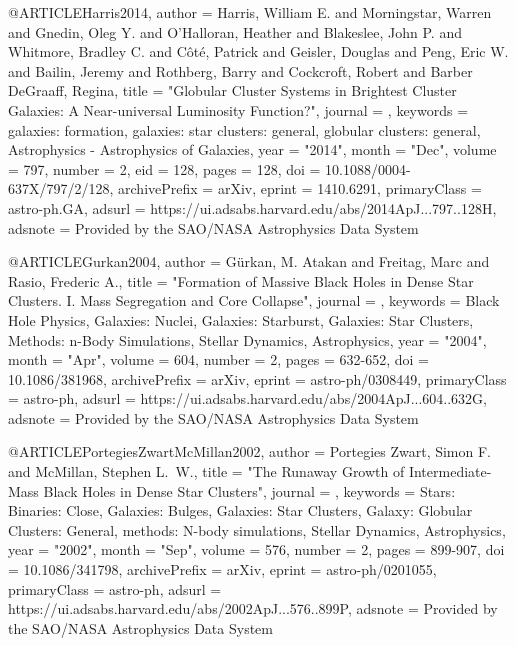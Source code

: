 \documentclass[twocolumn,tighten]{aastex63}
\begin{document}
{@ARTICLE{Harris2014,
       author = {{Harris}, William E. and {Morningstar}, Warren and {Gnedin}, Oleg Y. and
         {O'Halloran}, Heather and {Blakeslee}, John P. and
         {Whitmore}, Bradley C. and {C{\^o}t{\'e}}, Patrick and
         {Geisler}, Douglas and {Peng}, Eric W. and {Bailin}, Jeremy and
         {Rothberg}, Barry and {Cockcroft}, Robert and {Barber DeGraaff}, Regina},
        title = "{Globular Cluster Systems in Brightest Cluster Galaxies: A Near-universal Luminosity Function?}",
      journal = {\apj},
     keywords = {galaxies: formation, galaxies: star clusters: general, globular clusters: general, Astrophysics - Astrophysics of Galaxies},
         year = "2014",
        month = "Dec",
       volume = {797},
       number = {2},
          eid = {128},
        pages = {128},
          doi = {10.1088/0004-637X/797/2/128},
archivePrefix = {arXiv},
       eprint = {1410.6291},
 primaryClass = {astro-ph.GA},
       adsurl = {https://ui.adsabs.harvard.edu/abs/2014ApJ...797..128H},
      adsnote = {Provided by the SAO/NASA Astrophysics Data System}
}

@ARTICLE{Gurkan2004,
       author = {{G{\"u}rkan}, M. Atakan and {Freitag}, Marc and {Rasio}, Frederic A.},
        title = "{Formation of Massive Black Holes in Dense Star Clusters. I. Mass Segregation and Core Collapse}",
      journal = {\apj},
     keywords = {Black Hole Physics, Galaxies: Nuclei, Galaxies: Starburst, Galaxies: Star Clusters, Methods: n-Body Simulations, Stellar Dynamics, Astrophysics},
         year = "2004",
        month = "Apr",
       volume = {604},
       number = {2},
        pages = {632-652},
          doi = {10.1086/381968},
archivePrefix = {arXiv},
       eprint = {astro-ph/0308449},
 primaryClass = {astro-ph},
       adsurl = {https://ui.adsabs.harvard.edu/abs/2004ApJ...604..632G},
      adsnote = {Provided by the SAO/NASA Astrophysics Data System}
}

@ARTICLE{PortegiesZwartMcMillan2002,
       author = {{Portegies Zwart}, Simon F. and {McMillan}, Stephen L.~W.},
        title = "{The Runaway Growth of Intermediate-Mass Black Holes in Dense Star Clusters}",
      journal = {\apj},
     keywords = {Stars: Binaries: Close, Galaxies: Bulges, Galaxies: Star Clusters, Galaxy: Globular Clusters: General, methods: N-body simulations, Stellar Dynamics, Astrophysics},
         year = "2002",
        month = "Sep",
       volume = {576},
       number = {2},
        pages = {899-907},
          doi = {10.1086/341798},
archivePrefix = {arXiv},
       eprint = {astro-ph/0201055},
 primaryClass = {astro-ph},
       adsurl = {https://ui.adsabs.harvard.edu/abs/2002ApJ...576..899P},
      adsnote = {Provided by the SAO/NASA Astrophysics Data System}
}

}
\end{document}
